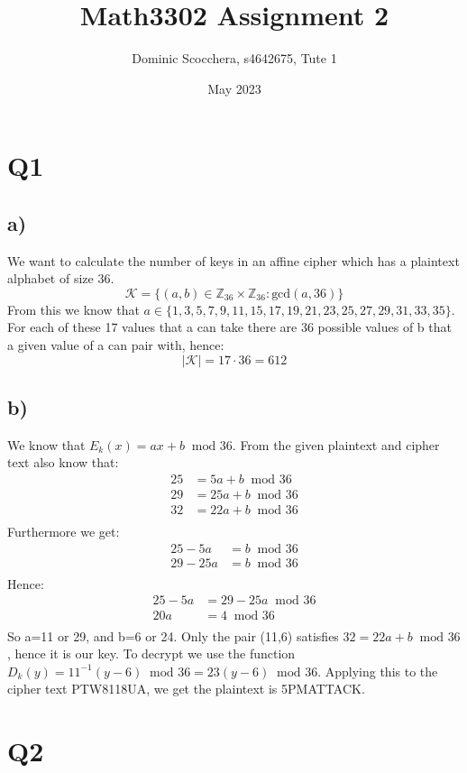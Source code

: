 \documentclass{article}
\title{Math3302 Assignment 2}
\author{Dominic Scocchera, s4642675, Tute 1}
\date{May 2023}
\begin{document}
\maketitle
\section*{Q1}
\subsection*{a)}
We want to calculate the number of keys in an affine cipher which has a plaintext alphabet of size 36.
$$\mathcal{K}=\{(a,b)\in\mathbb{Z}_{36}\times\mathbb{Z}_{36}:\text{gcd}(a,36)\}$$
From this we know that $a\in\{1,3,5,7,9,11,15,17,19,21,23,25,27,29,31,33,35\}$. For each of these 17 values that a can take there are 36 possible values of b that a given value of a can pair with, hence:
$$|\mathcal{K}|=17\cdot36=612$$
\subsection*{b)}
We know that $E_{k}(x)=ax+b\;\;\text{mod }36$. From the given plaintext and cipher text also know that:
\begin{align*}
25&=5a+b\;\;\text{mod }36\\
29&=25a+b\;\;\text{mod }36\\
32&=22a+b\;\;\text{mod }36\\
\end{align*}
Furthermore we get:
\begin{align*}
25-5a&=b\;\;\text{mod }36\\
29-25a&=b\;\;\text{mod }36\\
\end{align*}
Hence:
\begin{align*}
25-5a&=29-25a\;\;\text{mod }36\\
20a&=4\;\;\text{mod }36\\
\end{align*}
So a=11 or 29, and b=6 or 24. Only the pair (11,6) satisfies $32=22a+b\;\;\text{mod }36$, hence it is our key. To decrypt we use the function $D_{k}(y)=11^{-1}(y-6)\;\;\text{mod }36=23(y-6)\;\;\text{mod }36$. Applying this to the cipher text PTW8118UA, we get the plaintext is 5PMATTACK.
\section*{Q2}
\end{document}
